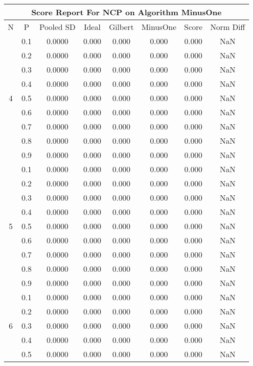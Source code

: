 \documentclass[11pt,a4paper]{report}
\begin{document}
\begin{longtable}{ | c | c || c | c | c | c | c | c | }
\hline
\multicolumn{8}{|c|}{ Score Report For NCP on Algorithm MinusOne} \\
\hline
N & P & Pooled SD &  Ideal &  Gilbert & MinusOne  & Score & Norm Diff \\
 \hline
 \hline
 \endhead
\multirow{9}{*}{4} & 0.1 & 0.0000 & 0.000 & 0.000 & 0.000 & 0.000 & NaN \\
 & 0.2 & 0.0000 & 0.000 & 0.000 & 0.000 & 0.000 & NaN \\
 & 0.3 & 0.0000 & 0.000 & 0.000 & 0.000 & 0.000 & NaN \\
 & 0.4 & 0.0000 & 0.000 & 0.000 & 0.000 & 0.000 & NaN \\
 & 0.5 & 0.0000 & 0.000 & 0.000 & 0.000 & 0.000 & NaN \\
 & 0.6 & 0.0000 & 0.000 & 0.000 & 0.000 & 0.000 & NaN \\
 & 0.7 & 0.0000 & 0.000 & 0.000 & 0.000 & 0.000 & NaN \\
 & 0.8 & 0.0000 & 0.000 & 0.000 & 0.000 & 0.000 & NaN \\
 & 0.9 & 0.0000 & 0.000 & 0.000 & 0.000 & 0.000 & NaN \\
 \hline
\multirow{9}{*}{5} & 0.1 & 0.0000 & 0.000 & 0.000 & 0.000 & 0.000 & NaN \\
 & 0.2 & 0.0000 & 0.000 & 0.000 & 0.000 & 0.000 & NaN \\
 & 0.3 & 0.0000 & 0.000 & 0.000 & 0.000 & 0.000 & NaN \\
 & 0.4 & 0.0000 & 0.000 & 0.000 & 0.000 & 0.000 & NaN \\
 & 0.5 & 0.0000 & 0.000 & 0.000 & 0.000 & 0.000 & NaN \\
 & 0.6 & 0.0000 & 0.000 & 0.000 & 0.000 & 0.000 & NaN \\
 & 0.7 & 0.0000 & 0.000 & 0.000 & 0.000 & 0.000 & NaN \\
 & 0.8 & 0.0000 & 0.000 & 0.000 & 0.000 & 0.000 & NaN \\
 & 0.9 & 0.0000 & 0.000 & 0.000 & 0.000 & 0.000 & NaN \\
 \hline
\multirow{9}{*}{6} & 0.1 & 0.0000 & 0.000 & 0.000 & 0.000 & 0.000 & NaN \\
 & 0.2 & 0.0000 & 0.000 & 0.000 & 0.000 & 0.000 & NaN \\
 & 0.3 & 0.0000 & 0.000 & 0.000 & 0.000 & 0.000 & NaN \\
 & 0.4 & 0.0000 & 0.000 & 0.000 & 0.000 & 0.000 & NaN \\
 & 0.5 & 0.0000 & 0.000 & 0.000 & 0.000 & 0.000 & NaN \\

\end{longtable}
\end{document}
